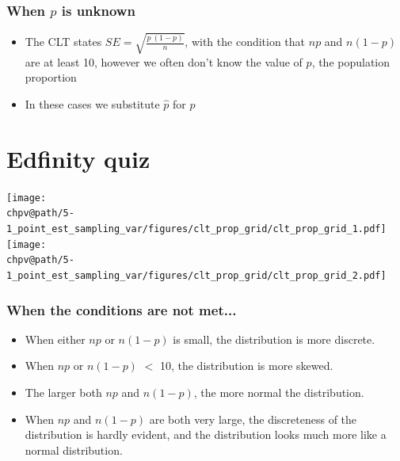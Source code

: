 \documentclass[t,compress,mathserif]{beamer}
\makeatletter
\def\chpv@path{../../Chp 5}
\makeatother
\begin{document}

\begin{frame}
\frametitle{When $p$ is unknown}

\begin{itemize}

\item The CLT states $SE = \sqrt{\frac{p~(1-p)}{n}}$, with the condition that $np$ and $n(1-p)$ are at least 10, however we often don't know the value of $p$, the population proportion

\item In these cases we substitute $\hat{p}$ for $p$

\end{itemize}

\end{frame}


\section{Edfinity quiz}


\begin{frame}


\begin{center}
\texttt{[image: \\chpv@path/5-1\_point\_est\_sampling\_var/figures/clt\_prop\_grid/clt\_prop\_grid\_1.pdf]}
\texttt{[image: \\chpv@path/5-1\_point\_est\_sampling\_var/figures/clt\_prop\_grid/clt\_prop\_grid\_2.pdf]}
\end{center}

\end{frame}


\begin{frame}
\frametitle{When the conditions are not met...}

\begin{itemize}

\item When either $np$ or $n(1-p)$ is small, the distribution is more discrete.
\item When $np$ or $n(1-p)$ $<$ 10, the distribution is more skewed.
\item The larger both $np$ and $n(1-p)$, the more normal the distribution.
\item When $np$ and $n(1-p)$ are both very large, the discreteness of the distribution is hardly evident, and the distribution looks much more like a normal distribution.

\end{itemize}

\end{frame}
\end{document}
